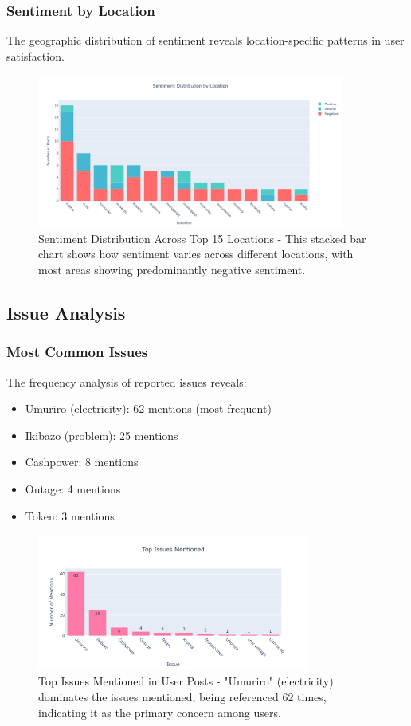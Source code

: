 \documentclass[a4paper,12pt]{article}
\begin{document}
	\subsubsection{Sentiment by Location}
	The geographic distribution of sentiment reveals location-specific patterns in user satisfaction.
	
	\begin{figure}[H]
		\centering
		\includegraphics[width=0.9\textwidth]{../results/sentiment_by_location.png}
		\caption{Sentiment Distribution Across Top 15 Locations - This stacked bar chart shows how sentiment varies across different locations, with most areas showing predominantly negative sentiment.}
		\label{fig:sentiment_location}
	\end{figure}
	
	\subsection{Issue Analysis}
	
	\subsubsection{Most Common Issues}
	The frequency analysis of reported issues reveals:
	\begin{itemize}
		\item Umuriro (electricity): 62 mentions (most frequent)
		\item Ikibazo (problem): 25 mentions
		\item Cashpower: 8 mentions
		\item Outage: 4 mentions
		\item Token: 3 mentions
	\end{itemize}
	
	\begin{figure}[H]
		\centering
		\includegraphics[width=0.8\textwidth]{../results/top_issues.png}
		\caption{Top Issues Mentioned in User Posts - "Umuriro" (electricity) dominates the issues mentioned, being referenced 62 times, indicating it as the primary concern among users.}
		\label{fig:top_issues}
	\end{figure}
	
\end{document}
